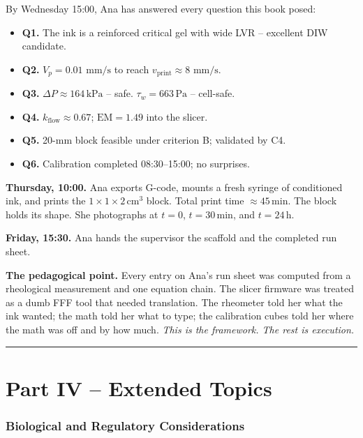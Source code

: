 \documentclass[11pt,a4paper]{article}
\newcommand{\mms}{\,\mathrm{mm/s}}
\begin{document}
By Wednesday 15:00, Ana has answered every question this book posed:
\begin{itemize}[leftmargin=1.4em,itemsep=2pt]
\item \textbf{Q1.} The ink is a reinforced critical gel with wide LVR --
  excellent DIW candidate.
\item \textbf{Q2.} $V_p=0.01\,\mms$ to reach $v_\mathrm{print}\approx
  8\,\mms$.
\item \textbf{Q3.} $\Delta P\approx 164\,\si{\kPa}$ -- safe.
  $\tau_w=663\,\si{\Pa}$ -- cell-safe.
\item \textbf{Q4.} $k_\mathrm{flow}\approx 0.67$;
  $\mathrm{EM}=1.49$ into the slicer.
\item \textbf{Q5.} 20-mm block feasible under criterion B; validated by C4.
\item \textbf{Q6.} Calibration completed 08:30--15:00; no surprises.
\end{itemize}

\textbf{Thursday, 10:00.} Ana exports G-code, mounts a fresh syringe of
conditioned ink, and prints the $1\times 1\times 2$\,cm$^3$ block.
Total print time $\approx 45\,\si{\minute}$. The block holds its shape.
She photographs at $t=0$, $t=30\,\si{\minute}$, and $t=24\,\si{\hour}$.

\textbf{Friday, 15:30.} Ana hands the supervisor the scaffold and the
completed run sheet.

\medskip\textbf{The pedagogical point.} Every entry on Ana's run sheet
was computed from a rheological measurement and one equation chain. The
slicer firmware was treated as a dumb FFF tool that needed translation.
The rheometer told her what the ink wanted; the math told her what to
type; the calibration cubes told her where the math was off and by how
much. \emph{This is the framework. The rest is execution.}

\bigskip\hrule\bigskip

\part*{Part IV -- Extended Topics}

\section{Biological and Regulatory Considerations}
\label{sec:bio}
\end{document}
